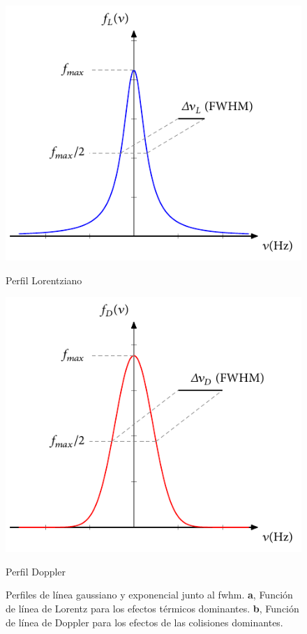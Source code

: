\begin{figure}[htbp]
  \centering
  \begin{subcaptionblock}{.4\textwidth}
    \centering
    \includegraphics[width=\textwidth]{Figuras/ch1_lorentz.pdf}
    \caption{Perfil Lorentziano}\label{fig:ch1_linefuna}
  \end{subcaptionblock}
  \begin{subcaptionblock}{.4\textwidth}
    \centering
    \includegraphics[width=\textwidth]{Figuras/ch1_doppler.pdf}
    \caption{Perfil Doppler}\label{fig:ch1_linefunb}
  \end{subcaptionblock}
  \caption{Perfiles de línea gaussiano y exponencial junto al \acrshort{fwhm}. \textbf{a}, Función de línea de Lorentz para los efectos térmicos dominantes. \textbf{b}, Función de línea de Doppler para los efectos de las colisiones dominantes.}
  \label{fig:1.5}
\end{figure}


